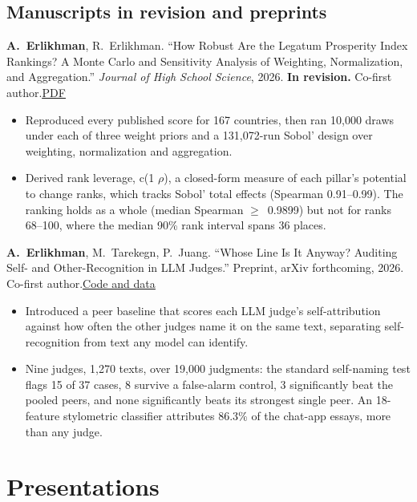 \documentclass[letterpaper,11pt]{article}
\newcommand{\rhosym}{\ensuremath{\rho}}
\newcommand{\geqsym}{\ensuremath{\geq}}
\newcommand{\sq}{\texttwosuperior}
\newcommand{\lnk}[2]{\href{#1}{\underline{#2}}}
\newcommand{\me}{\textbf{A.~Erlikhman}}
\begin{document}
\subsection{Manuscripts in revision and preprints}
\begin{pubs}[resume]
  \item \me, R.~Erlikhman. ``How Robust Are the Legatum Prosperity Index Rankings? A Monte Carlo and Sensitivity Analysis of Weighting, Normalization, and Aggregation.'' \textit{Journal of High School Science}, 2026. \textbf{In revision.} Co-first author.\enspace\lnk{https://adrianerlikhman.is-a.dev/papers/legatum-robustness-audit.pdf}{PDF}
  \begin{itemize}
    \item Reproduced every published score for 167 countries, then ran 10,000 draws under each of three weight priors and a 131,072-run Sobol' design over weighting, normalization and aggregation.
    \item Derived rank leverage, c\sq(1\,\textminus\,\rhosym\sq), a closed-form measure of each pillar's potential to change ranks, which tracks Sobol' total effects (Spearman 0.91--0.99). The ranking holds as a whole (median Spearman \geqsym\ 0.9899) but not for ranks 68--100, where the median 90\% rank interval spans 36 places.
  \end{itemize}
  \item \me, M.~Tarekegn, P.~Juang. ``Whose Line Is It Anyway? Auditing Self- and Other-Recognition in LLM Judges.'' Preprint, arXiv forthcoming, 2026. Co-first author.\enspace\lnk{https://github.com/adrian-erlikhman/self-recognition-peer-baseline}{Code and data}
  \begin{itemize}
    \item Introduced a peer baseline that scores each LLM judge's self-attribution against how often the other judges name it on the same text, separating self-recognition from text any model can identify.
    \item Nine judges, 1,270 texts, over 19,000 judgments: the standard self-naming test flags 15 of 37 cases, 8 survive a false-alarm control, 3 significantly beat the pooled peers, and none significantly beats its strongest single peer. An 18-feature stylometric classifier attributes 86.3\% of the chat-app essays, more than any judge.
  \end{itemize}
\end{pubs}

\section{Presentations}
\end{document}
